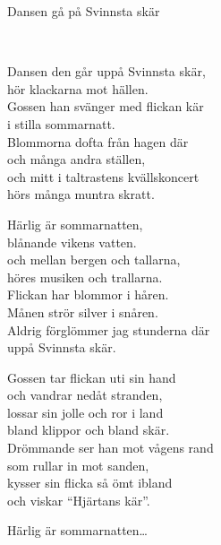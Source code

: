 \begin{song}{Dansen gå på Svinnsta skär}
	
	\\
	
	Dansen den går uppå Svinnsta skär,\\
	hör klackarna mot hällen.\\
	Gossen han svänger med flickan kär\\
	i stilla sommarnatt.\\
	Blommorna dofta från hagen där\\
	och många andra ställen,\\
	och mitt i taltrastens kvällskoncert\\
	hörs många muntra skratt.

	Härlig är sommarnatten,\\
	blånande vikens vatten.\\
	och mellan bergen och tallarna,\\
	höres musiken och trallarna.\\
	Flickan har blommor i håren.\\
	Månen strör silver i snåren.\\
	Aldrig förglömmer jag stunderna där\\
	uppå Svinnsta skär.

	Gossen tar flickan uti sin hand\\
	och vandrar nedåt stranden,\\
	lossar sin jolle och ror i land\\
	bland klippor och bland skär.\\
	Drömmande ser han mot vågens rand\\
	som rullar in mot sanden,\\
	kysser sin flicka så ömt ibland\\
	och viskar “Hjärtans kär”.

	Härlig är sommarnatten\ldots

\end{song}
